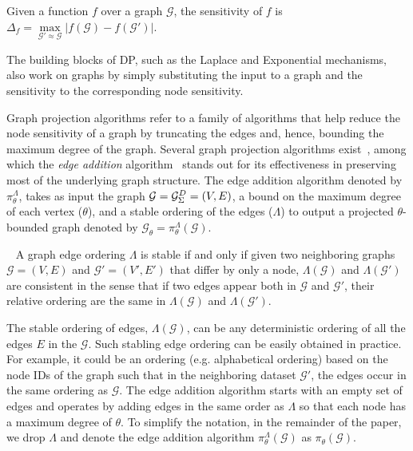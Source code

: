 \begin{definition}\label{def:node_sensitivity}
Given a function $f$ over a graph $\mathcal{G}$, the sensitivity of $f$ is 
$\Delta_f = \max\limits_{\mathcal{G}'\approx \mathcal{G}}|f(\mathcal{G}) - f(\mathcal{G}')|$.
\end{definition}

The building blocks of DP, such as the Laplace and Exponential mechanisms, also work on graphs by simply substituting the input to a graph and the sensitivity to the corresponding node sensitivity. 

 Graph projection algorithms refer to a family of algorithms that help reduce the node sensitivity of a graph by 
truncating the edges and, hence, bounding the maximum degree of the graph. Several graph projection algorithms exist~\cite{KasiviswanathanNRS13, blocki2013differentially}, among which the \textit{edge addition} algorithm~\cite{day2016publishing} stands out for its effectiveness in preserving most of the underlying graph structure. The edge addition algorithm denoted by $\pi_\theta^\Lambda$, takes as input the graph $\mathcal{G}= {\mathcal{G}_{{\Sigma}}^{D}} = (V, E)$, a bound on the maximum degree of each vertex ($\theta$), and a stable ordering of the edges ($\Lambda$) to output a projected $\theta$-bounded graph denoted by $\mathcal{G}_\theta = \pi_\theta^{\Lambda}(\mathcal{G})$. 
\begin{definition}~\label{def:stable_ordering} A graph edge ordering $\Lambda$ is stable if and only if given two neighboring graphs $\mathcal{G} = (V, E)$ and $\mathcal{G}' = (V', E')$ that differ by only a node, $\Lambda(\mathcal{G})$
and $\Lambda(\mathcal{G}')$ are consistent in the sense that if two edges appear
both in $\mathcal{G}$ and $\mathcal{G}'$, their relative ordering are the same in  $\Lambda(\mathcal{G})$ and
$\Lambda(\mathcal{G}')$.
\end{definition}
The stable ordering of edges, $\Lambda(\mathcal{G})$, can be any deterministic ordering of all the edges $E$ in the $\mathcal{G}$. Such stabling edge ordering can be easily obtained in practice. For example, it could be an ordering (e.g. alphabetical ordering) based on the node IDs of the graph such that in the neighboring dataset $\mathcal{G}'$, the edges occur in the same ordering as $\mathcal{G}$. The edge addition algorithm starts with an empty set of edges and operates by adding edges in the same order as $\Lambda$ so that each node has a maximum degree of $\theta$. 
To simplify the notation, in the remainder of the paper, we drop $\Lambda$ and denote the edge addition algorithm $\pi_\theta^{\Lambda}(\mathcal{G})$ as $\pi_\theta(\mathcal{G})$.

